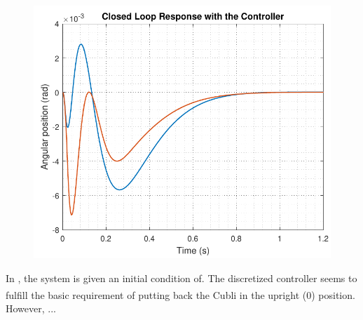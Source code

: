 \begin{minipage}{\linewidth}
\begin{minipage}{0.45\linewidth}
\begin{figure}[H]
      \includegraphics[scale=.53]{figures/positionComp.pdf}
      \centering
      \vspace{-.4cm}
      \captionsetup{justification=centering}
      \label{fig:discreteVsContinuousSimulation}
    \end{figure}\vspace{-5mm}
  \end{minipage}
\end{minipage}

In , the system is given an initial condition of. The discretized controller seems to fulfill the basic requirement of putting back the Cubli in the upright (\si{0^{\circ}}) position. However, ...